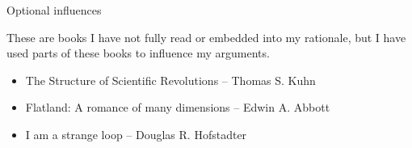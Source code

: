 \documentclass[11pt]{article}
\begin{document}
{\Large Optional influences\\\par}
\par These are books I have not fully read or embedded into my rationale, but I have used parts of these books to influence my arguments.
\begin{itemize}
	\item The Structure of Scientific Revolutions -- Thomas S. Kuhn
	\item Flatland: A romance of many dimensions -- Edwin A. Abbott
	\item I am a strange loop -- Douglas R. Hofstadter
\end{itemize}
\end{document}
